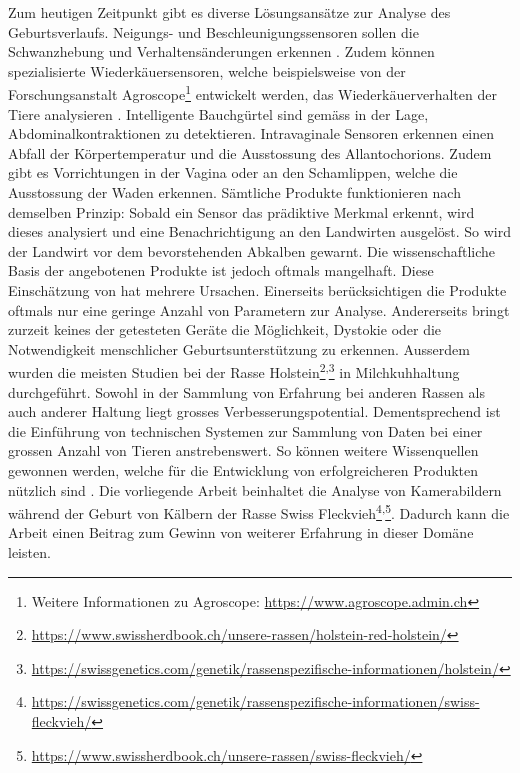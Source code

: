 Zum heutigen Zeitpunkt gibt es diverse Lösungsansätze zur Analyse des Geburtsverlaufs. Neigungs- und Beschleunigungssensoren sollen die Schwanzhebung und Verhaltensänderungen erkennen \citep[S. 6]{Saint-Dizier2015}. Zudem können spezialisierte Wiederkäuersensoren, welche beispielsweise von der Forschungsanstalt Agroscope\footnote{Weitere Informationen zu Agroscope: \url{https://www.agroscope.admin.ch}} entwickelt werden, das Wiederkäuerverhalten der Tiere analysieren \citep[S. 2]{Pahl2014}. Intelligente Bauchgürtel sind gemäss \citep[S. 6]{Saint-Dizier2015} in der Lage, Abdominalkontraktionen zu detektieren. Intravaginale Sensoren erkennen einen Abfall der Körpertemperatur und die Ausstossung des Allantochorions. Zudem gibt es Vorrichtungen in der Vagina oder an den Schamlippen, welche die Ausstossung der Waden erkennen. Sämtliche Produkte funktionieren nach demselben Prinzip: Sobald ein Sensor das prädiktive Merkmal erkennt, wird dieses analysiert und eine Benachrichtigung an den Landwirten ausgelöst. So wird der Landwirt vor dem bevorstehenden Abkalben gewarnt. Die wissenschaftliche  Basis der angebotenen Produkte ist  jedoch oftmals mangelhaft. Diese Einschätzung von \citep[S. 6]{Saint-Dizier2015} hat mehrere Ursachen. Einerseits berücksichtigen die Produkte oftmals nur eine geringe Anzahl von Parametern zur Analyse. Andererseits bringt zurzeit keines der getesteten Geräte die Möglichkeit, Dystokie oder die Notwendigkeit menschlicher Geburtsunterstützung zu erkennen. Ausserdem wurden die meisten Studien bei der Rasse Holstein\footnote{ \url{https://www.swissherdbook.ch/unsere-rassen/holstein-red-holstein/}}\textsuperscript{,}\footnote{\url{https://swissgenetics.com/genetik/rassenspezifische-informationen/holstein/}} in Milchkuhhaltung durchgeführt. Sowohl in der Sammlung von Erfahrung bei anderen Rassen als auch anderer Haltung liegt grosses Verbesserungspotential. Dementsprechend ist die Einführung von technischen Systemen zur Sammlung von Daten bei einer grossen Anzahl von Tieren anstrebenswert. So können weitere Wissenquellen gewonnen werden, welche für die Entwicklung von erfolgreicheren Produkten nützlich sind \citep[S. 6]{Saint-Dizier2015}. Die vorliegende Arbeit beinhaltet die Analyse von Kamerabildern während der Geburt von Kälbern der Rasse Swiss Fleckvieh\footnote{\url{https://swissgenetics.com/genetik/rassenspezifische-informationen/swiss-fleckvieh/}}\textsuperscript{,}\footnote{\url{https://www.swissherdbook.ch/unsere-rassen/swiss-fleckvieh/}}. Dadurch kann die Arbeit einen Beitrag zum Gewinn von weiterer Erfahrung in dieser Domäne leisten.

